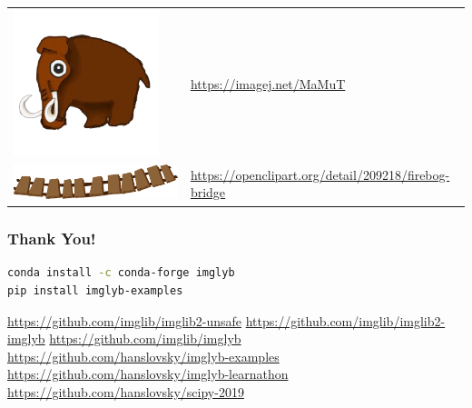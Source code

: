 \documentclass[%
]{beamer}
\newcommand{\urlScrSz}[1]{\scriptsize\url{#1}}
\begin{document}
\begin{frame}
\begin{tabulary}{\linewidth}{lL}
        \includegraphics[height=0.04\textwidth]{fig/logos/imagej/mammut.png} & \urlScrSz{https://imagej.net/MaMuT} \\
        \includegraphics[height=0.04\textwidth]{fig/bridge.pdf} & \urlScrSz{https://openclipart.org/detail/209218/firebog-bridge}
    \end{tabulary}
\end{frame}

\begin{frame}[fragile]
    \frametitle{Thank You!}
\begin{lstlisting}[language=bash]
conda install -c conda-forge imglyb
pip install imglyb-examples
\end{lstlisting}
\urlScrSz{https://github.com/imglib/imglib2-unsafe}
\urlScrSz{https://github.com/imglib/imglib2-imglyb}
\urlScrSz{https://github.com/imglib/imglyb}
\urlScrSz{https://github.com/hanslovsky/imglyb-examples}
\urlScrSz{https://github.com/hanslovsky/imglyb-learnathon}
\urlScrSz{https://github.com/hanslovsky/scipy-2019}
\end{frame}
\end{document}
